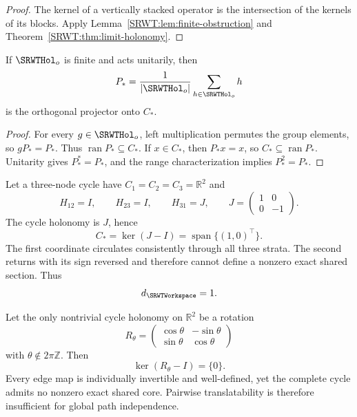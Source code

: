 \begin{proof}
The kernel of a vertically stacked operator is the intersection of the kernels
of its blocks. Apply Lemma~\ref{SRWT:lem:finite-obstruction} and
Theorem~\ref{SRWT:thm:limit-holonomy}.
\end{proof}

\begin{SRWTcorollary}\label{SRWT:cor:averaging-projector}
If \(\SRWTHol_o\) is finite and acts unitarily, then
\[
P_*=
\frac{1}{|\SRWTHol_o|}
\sum_{h\in\SRWTHol_o}h
\]
is the orthogonal projector onto \(C_*\).
\end{SRWTcorollary}

\begin{proof}
For every \(g\in\SRWTHol_o\), left multiplication permutes the group elements, so
\(gP_*=P_*\). Thus \(\operatorname{ran}P_*\subseteq C_*\). If
\(x\in C_*\), then \(P_*x=x\), so \(C_*\subseteq\operatorname{ran}P_*\).
Unitarity gives \(P_*^*=P_*\), and the range characterization implies
\(P_*^2=P_*\).
\end{proof}


\begin{SRWTexample}\label{SRWT:ex:reflection-cycle}
Let a three-node cycle have \(C_1=C_2=C_3=\mathbb R^2\) and
\[
H_{12}=I,
\qquad
H_{23}=I,
\qquad
H_{31}=J,
\qquad
J=
\begin{pmatrix}
1&0\\
0&-1
\end{pmatrix}.
\]
The cycle holonomy is \(J\), hence
\[
C_*=\ker(J-I)=\operatorname{span}\{(1,0)^\top\}.
\]
The first coordinate circulates consistently through all three strata. The
second returns with its sign reversed and therefore cannot define a nonzero
exact shared section. Thus
\[
d_{\SRWTWorkspace}=1.
\]
\end{SRWTexample}

\begin{SRWTexample}\label{SRWT:ex:rotation-obstruction}
Let the only nontrivial cycle holonomy on \(\mathbb R^2\) be a rotation
\[
R_\theta=
\begin{pmatrix}
\cos\theta&-\sin\theta\\
\sin\theta&\cos\theta
\end{pmatrix}
\]
with \(\theta\notin2\pi\mathbb Z\). Then
\[
\ker(R_\theta-I)=\{0\}.
\]
Every edge map is individually invertible and well-defined, yet the complete
cycle admits no nonzero exact shared core. Pairwise translatability is
therefore insufficient for global path independence.
\end{SRWTexample}

